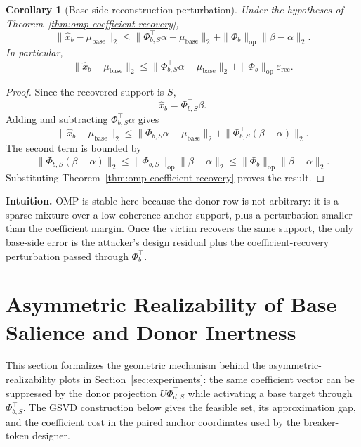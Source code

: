 \documentclass{article}
\theoremstyle{plain}
\newtheorem{corollary}[theorem]{Corollary}
\theoremstyle{definition}
\theoremstyle{remark}
\begin{document}
\begin{corollary}[Base-side reconstruction perturbation]
\label{cor:omp-base-reconstruction-error}
Under the hypotheses of Theorem~\ref{thm:omp-coefficient-recovery},
\[
\|\widehat{x}_b-\mu_{\text{base}}\|_2
\le
\|\Phi_{b,S}^\top\alpha-\mu_{\text{base}}\|_2
+
\|\Phi_b\|_{\mathrm{op}}\|\beta-\alpha\|_2.
\]
In particular,
\[
\|\widehat{x}_b-\mu_{\text{base}}\|_2
\le
\|\Phi_{b,S}^\top\alpha-\mu_{\text{base}}\|_2
+
\|\Phi_b\|_{\mathrm{op}}\varepsilon_{\mathrm{rec}}.
\]
\end{corollary}

\begin{proof}
Since the recovered support is $S$,
\[
\widehat{x}_b=\Phi_{b,S}^\top\beta.
\]
Adding and subtracting $\Phi_{b,S}^\top\alpha$ gives
\[
\|\widehat{x}_b-\mu_{\text{base}}\|_2
\le
\|\Phi_{b,S}^\top\alpha-\mu_{\text{base}}\|_2
+
\|\Phi_{b,S}^\top(\beta-\alpha)\|_2.
\]
The second term is bounded by
\[
\|\Phi_{b,S}^\top(\beta-\alpha)\|_2
\le
\|\Phi_{b,S}\|_{\mathrm{op}}\|\beta-\alpha\|_2
\le
\|\Phi_b\|_{\mathrm{op}}\|\beta-\alpha\|_2.
\]
Substituting Theorem~\ref{thm:omp-coefficient-recovery} proves the result.
\end{proof}

\noindent\textbf{Intuition.}
OMP is stable here because the donor row is not arbitrary: it is a sparse mixture over a low-coherence anchor support, plus a perturbation smaller than the coefficient margin. Once the victim recovers the same support, the only base-side error is the attacker's design residual plus the coefficient-recovery perturbation passed through $\Phi_b^\top$.

\section{Asymmetric Realizability of Base Salience and Donor Inertness}
\label{app:asymmetric-realizability}

This section formalizes the geometric mechanism behind the asymmetric-realizability plots in Section~\ref{sec:experiments}: the same coefficient vector can be suppressed by the donor projection $U\Phi_{d,S}^\top$ while activating a base target through $\Phi_{b,S}^\top$. The GSVD construction below gives the feasible set, its approximation gap, and the coefficient cost in the paired anchor coordinates used by the breaker-token designer.
\end{document}
